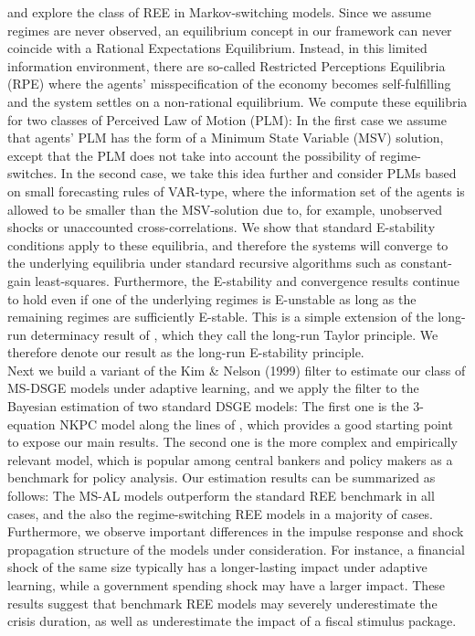 \documentclass[12pt,reqno]{article}
\numberwithin{equation}{section}
\begin{document}
\cite{farmer2009understanding} and \cite{farmer2011minimal} explore the class of REE in Markov-switching models. Since we assume regimes are never observed, an equilibrium concept in our framework can never coincide with a Rational Expectations Equilibrium. Instead, in this limited information environment, there are so-called Restricted Perceptions Equilibria (RPE) where the agents' misspecification of the economy becomes self-fulfilling and the system settles on a non-rational equilibrium. We compute these equilibria for two classes of Perceived Law of Motion (PLM): In the first case we assume that agents' PLM has the form of a Minimum State Variable (MSV) solution, except that the PLM does not take into account the possibility of regime-switches. In the second case, we take this idea further and consider PLMs based on small forecasting rules of VAR-type, where the information set of the agents is allowed to be smaller than the MSV-solution due to, for example, unobserved shocks or unaccounted cross-correlations. We show that standard E-stability conditions apply to these equilibria, and therefore the systems will converge to the underlying equilibria under standard recursive algorithms such as constant-gain least-squares. Furthermore, the E-stability and convergence results continue to hold even if one of the underlying regimes is E-unstable as long as the remaining regimes are sufficiently E-stable. This is a simple extension of the long-run determinacy result of \cite{davig2007generalizing}, which they call the long-run Taylor principle. We therefore denote our result as the long-run E-stability principle.\\

\noindent
Next we build a variant of the Kim \& Nelson (1999) filter to estimate our class of MS-DSGE models under adaptive learning, and we apply the filter to the Bayesian estimation of two standard DSGE models: The first one is the 3-equation NKPC model along the lines of \cite{woodford2013macroeconomic}, which provides a good starting point to expose our main results. The second one is the more complex and empirically relevant \cite{smets2007shocks} model, which is popular among central bankers and policy makers as a benchmark for policy analysis. Our estimation results can be summarized as follows: The MS-AL models outperform the standard REE benchmark in all cases, and the also the regime-switching REE models in a majority of cases. Furthermore, we observe important differences in the impulse response and shock propagation structure of the models under consideration. For instance, a financial shock of the same size typically has a longer-lasting impact under adaptive learning, while a government spending shock may have a larger impact. These results suggest that benchmark REE models may severely underestimate the crisis duration, as well as underestimate the impact of a fiscal stimulus package. \\
\end{document}
